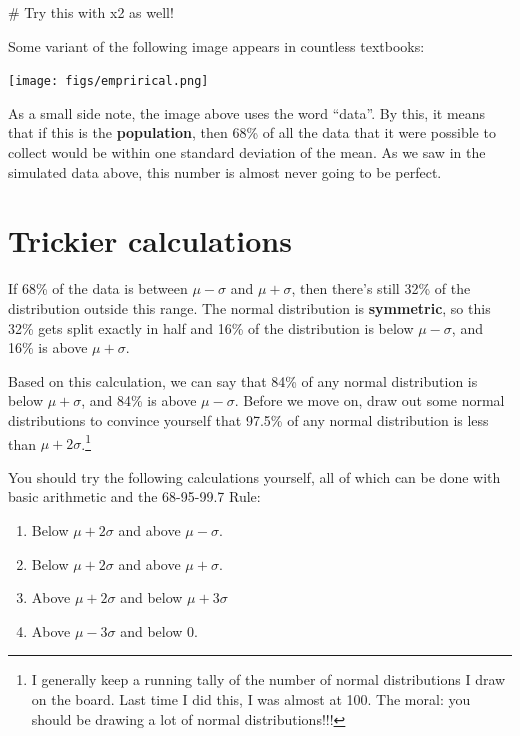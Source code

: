 \documentclass[
  letterpaper,
  DIV=11,
  numbers=noendperiod]{scrreprt}
\newenvironment{Shaded}{\begin{snugshade}}{\end{snugshade}}
\newcommand{\CommentTok}[1]{\textcolor[rgb]{0.37,0.37,0.37}{#1}}
\providecommand{\tightlist}{%
  \setlength{\itemsep}{0pt}\setlength{\parskip}{0pt}}\usepackage{longtable,booktabs,array}
\begin{document}
\begin{Shaded}
\begin{Highlighting}[]
\CommentTok{\# Try this with x2 as well!}
\end{Highlighting}
\end{Shaded}

Some variant of the following image appears in countless textbooks:

\texttt{[image: figs/emprirical.png]}

As a small side note, the image above uses the word ``data''. By this,
it means that if this is the \textbf{population}, then 68\% of all the
data that it were possible to collect would be within one standard
deviation of the mean. As we saw in the simulated data above, this
number is almost never going to be perfect.

\hypertarget{trickier-calculations}{%
\section{Trickier calculations}\label{trickier-calculations}}

If 68\% of the data is between \(\mu - \sigma\) and \(\mu + \sigma\),
then there's still 32\% of the distribution outside this range. The
normal distribution is \textbf{symmetric}, so this 32\% gets split
exactly in half and 16\% of the distribution is below \(\mu - \sigma\),
and 16\% is above \(\mu + \sigma\).

Based on this calculation, we can say that 84\% of any normal
distribution is below \(\mu + \sigma\), and 84\% is above
\(\mu - \sigma\). Before we move on, draw out some normal distributions
to convince yourself that 97.5\% of any normal distribution is less than
\(\mu + 2\sigma\).\footnote{I generally keep a running tally of the
  number of normal distributions I draw on the board. Last time I did
  this, I was almost at 100. The moral: you should be drawing a lot of
  normal distributions!!!}

You should try the following calculations yourself, all of which can be
done with basic arithmetic and the 68-95-99.7 Rule:

\begin{enumerate}
\def\labelenumi{\arabic{enumi}.}
\tightlist
\item
  Below \(\mu+2\sigma\) and above \(\mu-\sigma\).
\item
  Below \(\mu+2\sigma\) and above \(\mu+\sigma\).
\item
  Above \(\mu + 2\sigma\) and below \(\mu + 3\sigma\)
\item
  Above \(\mu - 3\sigma\) and below 0.
\end{enumerate}
\end{document}
